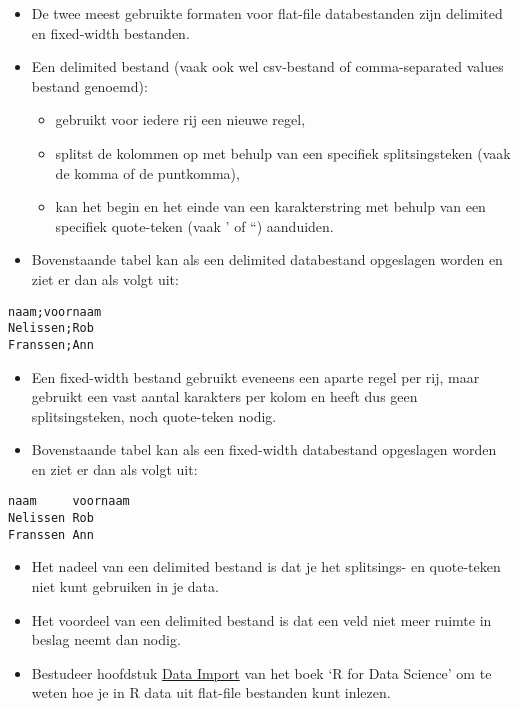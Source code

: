 \documentclass[]{memoir}
\providecommand{\tightlist}{%
  \setlength{\itemsep}{0pt}\setlength{\parskip}{0pt}}
\begin{document}
\begin{itemize}
\tightlist
\item
  De twee meest gebruikte formaten voor flat-file databestanden zijn
  delimited en fixed-width bestanden.
\item
  Een delimited bestand (vaak ook wel csv-bestand of comma-separated
  values bestand genoemd):

  \begin{itemize}
  \tightlist
  \item
    gebruikt voor iedere rij een nieuwe regel,
  \item
    splitst de kolommen op met behulp van een specifiek splitsingsteken
    (vaak de komma of de puntkomma),
  \item
    kan het begin en het einde van een karakterstring met behulp van een
    specifiek quote-teken (vaak ' of ``) aanduiden.
  \end{itemize}
\item
  Bovenstaande tabel kan als een delimited databestand opgeslagen worden
  en ziet er dan als volgt uit:
\end{itemize}

\begin{verbatim}
naam;voornaam
Nelissen;Rob
Franssen;Ann
\end{verbatim}

\begin{itemize}
\tightlist
\item
  Een fixed-width bestand gebruikt eveneens een aparte regel per rij,
  maar gebruikt een vast aantal karakters per kolom en heeft dus geen
  splitsingsteken, noch quote-teken nodig.
\item
  Bovenstaande tabel kan als een fixed-width databestand opgeslagen
  worden en ziet er dan als volgt uit:
\end{itemize}

\begin{verbatim}
naam     voornaam
Nelissen Rob
Franssen Ann
\end{verbatim}

\begin{itemize}
\tightlist
\item
  Het nadeel van een delimited bestand is dat je het splitsings- en
  quote-teken niet kunt gebruiken in je data.
\item
  Het voordeel van een delimited bestand is dat een veld niet meer
  ruimte in beslag neemt dan nodig.
\item
  Bestudeer hoofdstuk \href{http://r4ds.had.co.nz/data-import.html}{Data
  Import} van het boek `R for Data Science' om te weten hoe je in R data
  uit flat-file bestanden kunt inlezen.
\end{itemize}
\end{document}
